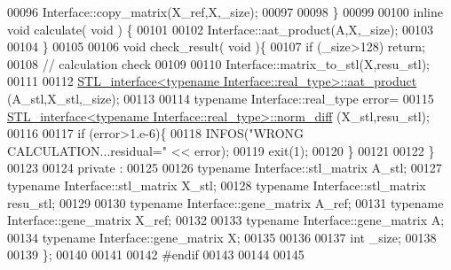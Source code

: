 \begin{DoxyCode}
00096     Interface::copy\_matrix(X\_ref,X,\_size);
00097 
00098   \}
00099 
00100   \textcolor{keyword}{inline} \textcolor{keywordtype}{void} calculate( \textcolor{keywordtype}{void} ) \{
00101 
00102       Interface::aat\_product(A,X,\_size);
00103 
00104   \}
00105 
00106   \textcolor{keywordtype}{void} check\_result( \textcolor{keywordtype}{void} )\{
00107     \textcolor{keywordflow}{if} (\_size>128) \textcolor{keywordflow}{return};
00108     \textcolor{comment}{// calculation check}
00109 
00110     Interface::matrix\_to\_stl(X,resu\_stl);
00111 
00112     \hyperlink{class_s_t_l__interface}{STL\_interface<typename Interface::real\_type>::aat\_product}
      (A\_stl,X\_stl,\_size);
00113 
00114     \textcolor{keyword}{typename} Interface::real\_type error=
00115       \hyperlink{class_s_t_l__interface}{STL\_interface<typename Interface::real\_type>::norm\_diff}
      (X\_stl,resu\_stl);
00116 
00117     \textcolor{keywordflow}{if} (error>1.e-6)\{
00118       INFOS(\textcolor{stringliteral}{"WRONG CALCULATION...residual="} << error);
00119       exit(1);
00120     \}
00121 
00122   \}
00123 
00124 private :
00125 
00126   \textcolor{keyword}{typename} Interface::stl\_matrix A\_stl;
00127   \textcolor{keyword}{typename} Interface::stl\_matrix X\_stl;
00128   \textcolor{keyword}{typename} Interface::stl\_matrix resu\_stl;
00129 
00130   \textcolor{keyword}{typename} Interface::gene\_matrix A\_ref;
00131   \textcolor{keyword}{typename} Interface::gene\_matrix X\_ref;
00132 
00133   \textcolor{keyword}{typename} Interface::gene\_matrix A;
00134   \textcolor{keyword}{typename} Interface::gene\_matrix X;
00135 
00136 
00137   \textcolor{keywordtype}{int} \_size;
00138 
00139 \};
00140 
00141 
00142 \textcolor{preprocessor}{#endif}
00143 
00144 
00145 
\end{DoxyCode}
